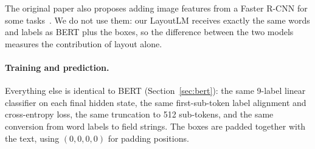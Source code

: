 The original paper also proposes adding image features from a Faster R-CNN for some tasks~\cite{xu2020layoutlm}. We do not use them: our LayoutLM receives exactly the same words and labels as BERT plus the boxes, so the difference between the two models measures the contribution of layout alone.

\paragraph{Training and prediction.}
Everything else is identical to BERT (Section~\ref{sec:bert}): the same 9-label linear classifier on each final hidden state, the same first-sub-token label alignment and cross-entropy loss, the same truncation to 512 sub-tokens, and the same conversion from word labels to field strings. The boxes are padded together with the text, using $(0,0,0,0)$ for padding positions.

